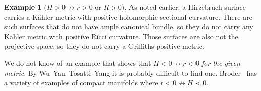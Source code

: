 \documentclass[10pt,a4paper]{amsart}
\theoremstyle{definition}
\newtheorem{exam}[theo]{Example}
\begin{document}
\begin{exam}[$H > 0 \not\to r > 0$ or $R > 0$]
As noted earlier, a Hirzebruch surface carries a K\"ahler metric with positive
holomorphic sectional curvature. There are such surfaces that do not have ample
canonical bundle, so they do not carry any K\"ahler metric with positive Ricci
curvature.
Those surfaces are also not the projective space, so they do not carry a
Griffiths-positive metric.
\end{exam}

We do not know of an example that shows that $H < 0 \not\to r < 0$ \emph{for
the given metric}.
By Wu--Yau--Tosatti--Yang it is probably difficult to find one.
Broder~\cite{broder} has a variety of examples of compact manifolds where $r <
0 \not\to H<0$.



\end{document}
